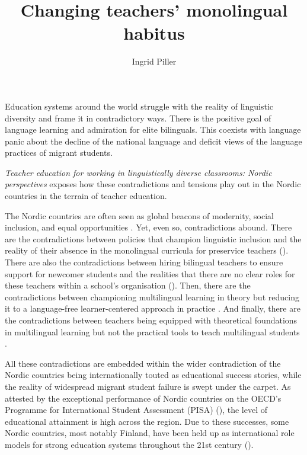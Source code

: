 \documentclass[output=paper]{langscibook}
\author{Ingrid Piller\orcid{}\affiliation{Macquarie University, Australia}}
\title{Changing teachers’ monolingual habitus}
\begin{document}
\maketitle 

\noindent 
Education systems around the world struggle with the reality of linguistic diversity and frame it in contradictory ways. There is the positive goal of language learning and admiration for elite bilinguals. This coexists with language panic about the decline of the national language and deficit views of the language practices of migrant students.

\textit{Teacher education for working in linguistically diverse classrooms: Nordic perspectives} exposes how these contradictions and tensions play out in the Nordic countries in the terrain of teacher education.

The Nordic countries are often seen as global beacons of modernity, social inclusion, and equal opportunities \parencite{chapters/1_reath}. Yet, even so, contradictions abound. There are the contradictions between policies that champion linguistic inclusion and the reality of their absence in the monolingual curricula for preservice teachers (\citealt{chapters/2_Gunnthorsdottira}). There are also the contradictions between hiring bilingual teachers to ensure support for newcomer students and the realities that there are no clear roles for these teachers within a school’s organisation (\citealt{chapters/3_rosen}). Then, there are the contradictions between championing multilingual learning in theory but reducing it to a language-free learner-centered approach in practice \parencite{chapters/4_gudjonsdottir}. And finally, there are the contradictions between teachers being equipped with theoretical foundations in multilingual learning but not the practical tools to teach multilingual students \parencite{chapters/7_alisaari,chapters/8_heikkola,chapters/6_iversen,chapters/5_ostergaard}. 

\begin{sloppypar}
All these contradictions are embedded within the wider contradiction of the Nordic countries being internationally touted as educational success stories, while the reality of widespread migrant student failure is swept under the carpet. As attested by the exceptional performance of Nordic countries on the OECD’s Programme for International Student Assessment (PISA) (\citealt{OECD2023}), the level of educational attainment is high across the region. Due to these successes, some Nordic countries, most notably Finland, have been held up as international role models for strong education systems throughout the 21st century (\citealt{Ahonen2021}). 
\end{sloppypar}
\end{document}
